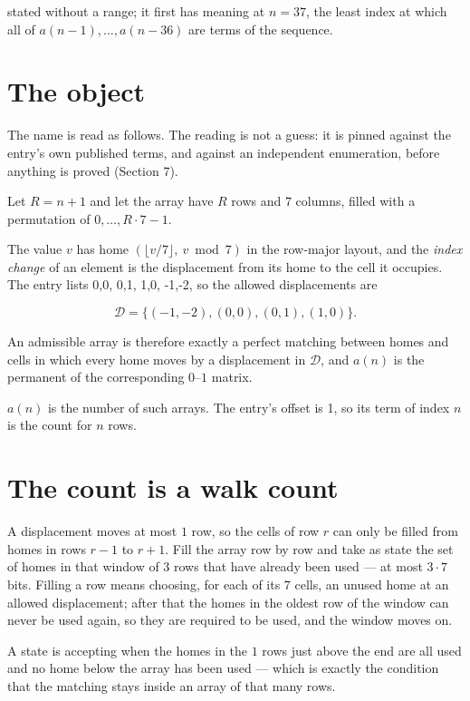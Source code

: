\documentclass[11pt]{article}
\theoremstyle{definition}
\begin{document}
stated without a range; it first has meaning at $n = 37$, the least index at which all of $a(n-1),\dots,a(n-36)$ are terms of the sequence.

\section{The object}

The name is read as follows. The reading is not a guess: it is pinned against the entry's own published terms, and against an independent enumeration, before anything is proved (Section 7).

Let $R = n + 1$ and let the array have $R$ rows and $7$ columns, filled with a permutation of $0,\dots,R\cdot7-1$.

The value $v$ has home $(\lfloor v/7\rfloor,\ v \bmod 7)$ in the row-major layout, and the {\itshape index change} of an element is the displacement from its home to the cell it occupies. The entry lists 0,0, 0,1, 1,0, -1,-2, so the allowed displacements are

\[\mathcal{D} = \{(-1,-2), (0,0), (0,1), (1,0)\}.\]

An admissible array is therefore exactly a perfect matching between homes and cells in which every home moves by a displacement in $\mathcal{D}$, and $a(n)$ is the permanent of the corresponding $0$--$1$ matrix.

$a(n)$ is the number of such arrays. The entry's offset is 1, so its term of index $n$ is the count for $n$ rows.

\section{The count is a walk count}

A displacement moves at most $1$ row, so the cells of row $r$ can only be filled from homes in rows $r-1$ to $r+1$. Fill the array row by row and take as state the set of homes in that window of $3$ rows that have already been used --- at most $3\cdot7$ bits. Filling a row means choosing, for each of its $7$ cells, an unused home at an allowed displacement; after that the homes in the oldest row of the window can never be used again, so they are required to be used, and the window moves on.

A state is accepting when the homes in the $1$ rows just above the end are all used and no home below the array has been used --- which is exactly the condition that the matching stays inside an array of that many rows.
\end{document}
